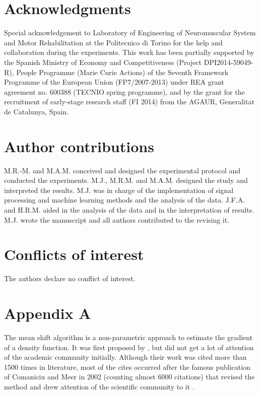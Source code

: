 \section{Acknowledgments}
Special acknowledgement to Laboratory of Engineering of Neuromuscular System and Motor Rehabilitation at the Politecnico di Torino for the help and collaboration during the experiments. This work has been partially supported by the Spanish Ministry of Economy and Competitiveness (Project DPI2014-59049-R), People Programme (Marie Curie Actions) of the Seventh Framework Programme of the European Union (FP7/2007-2013) under REA grant agreement no. 600388 (TECNIO spring programme), and by the grant for the recruitment of early-stage research staff (FI 2014) from the AGAUR, Generalitat de Catalunya, Spain.


\section{Author contributions}
M.R.-M. and M.A.M. conceived and designed the experimental protocol and conducted the experiments. M.J., M.R.M. and M.A.M. designed the study and interpreted the results. M.J. was in charge of the implementation of signal processing and machine learning methods and the analysis of the data. J.F.A. and H.R.M. aided in the analysis of the data and in the interpretation of results. M.J. wrote the manuscript and all authors contributed to the revising it.

\section{Conflicts of interest}
The authors declare no conflict of interest.
\clearpage

\section{Appendix A}
The mean shift algorithm is a non-parametric approach to estimate the gradient of a density function. It was first proposed by \citet{Fukunaga1975}, but did not get a lot of attention of the academic community initially. Although their work was cited more than 1500 times in literature, most of the cites occurred after the famous publication of Comaniciu and Meer in 2002 (counting almost 6000 citations) that revised the method and drew attention of the scientific community to it \citep{Comaniciu2002}.

